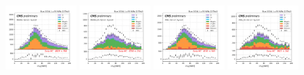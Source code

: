 \begin{figure}
    \includegraphics[width=0.24\textwidth]{appendices/qcdSF/figures/mutau_>=2_==0_dilepton_mass.png}
    \includegraphics[width=0.24\textwidth]{appendices/qcdSF/figures/mutau_ss_>=2_==0_dilepton_mass.png}
    \includegraphics[width=0.24\textwidth]{appendices/qcdSF/figures/etau_>=2_==0_dilepton_mass.png}
    \includegraphics[width=0.24\textwidth]{appendices/qcdSF/figures/etau_ss_>=2_==0_dilepton_mass.png}
    

\end{figure}
